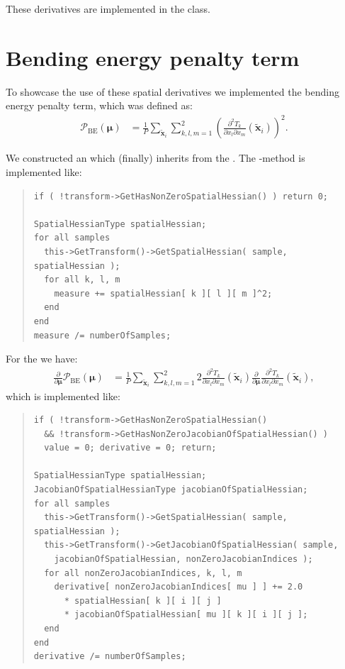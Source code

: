 \documentclass{InsightArticle}
\newcommand{\vmu}{\bm{\mu}}
\newcommand{\vxt}[1][]{\bm{\widetilde x}_{#1}}
\newcommand{\D}[2]{\frac{\partial #1}{\partial #2}}
\newcommand{\Dd}[3]{\frac{\partial^2 #1}{\partial #2 \partial #3}}
\begin{document}
These derivatives are implemented in the
 class.


\section{Bending energy penalty term}\label{sec:bendingenergy}

To showcase the use of these spatial derivatives we implemented the
bending energy penalty term, which was defined as:
\begin{align}
\mathcal{P}_{\mathrm{BE}}(\vmu) &= \frac{1}{P} \sum_{\vxt[i]}
\sum_{k,l,m = 1}^2 \left( \Dd{T_k}{x_l}{x_m}(\vxt[i]) \right)^2.
\end{align}

We constructed an  which
(finally) inherits from the . The
-method is implemented like:
\begin{quote}
\begin{verbatim}
if ( !transform->GetHasNonZeroSpatialHessian() ) return 0;

SpatialHessianType spatialHessian;
for all samples
  this->GetTransform()->GetSpatialHessian( sample, spatialHessian );
  for all k, l, m
    measure += spatialHessian[ k ][ l ][ m ]^2;
  end
end
measure /= numberOfSamples;
\end{verbatim}
\end{quote}

For the  we have:
\begin{align}
\D{}{\vmu} \mathcal{P}_{\mathrm{BE}}(\vmu) &=  \frac{1}{P}
\sum_{\vxt[i]} \sum_{k,l,m = 1}^2 2 \Dd{T_k}{x_l}{x_m} (\vxt[i])
\D{}{\vmu} \Dd{T_k}{x_l}{x_m}(\vxt[i]),
\end{align}
which is implemented like:
\begin{quote}
\begin{verbatim}
if ( !transform->GetHasNonZeroSpatialHessian()
  && !transform->GetHasNonZeroJacobianOfSpatialHessian() )
  value = 0; derivative = 0; return;

SpatialHessianType spatialHessian;
JacobianOfSpatialHessianType jacobianOfSpatialHessian;
for all samples
  this->GetTransform()->GetSpatialHessian( sample, spatialHessian );
  this->GetTransform()->GetJacobianOfSpatialHessian( sample,
    jacobianOfSpatialHessian, nonZeroJacobianIndices );
  for all nonZeroJacobianIndices, k, l, m
    derivative[ nonZeroJacobianIndices[ mu ] ] += 2.0
      * spatialHessian[ k ][ i ][ j ]
      * jacobianOfSpatialHessian[ mu ][ k ][ i ][ j ];
  end
end
derivative /= numberOfSamples;
\end{verbatim}
\end{quote}
\end{document}
